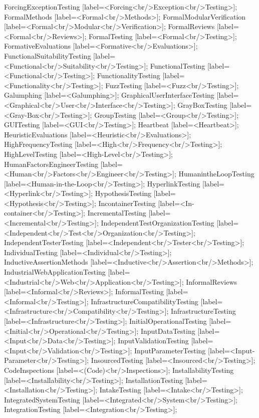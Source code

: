 \documentclass{article}
\begin{document}
{ForcingExceptionTesting [label=<Forcing<br/>Exception<br/>Testing>];
FormalMethods [label=<Formal<br/>Methods>];
FormalModularVerification [label=<Formal<br/>Modular<br/>Verification>];
FormalReviews [label=<Formal<br/>Reviews>];
FormalTesting [label=<Formal<br/>Testing>];
FormativeEvaluations [label=<Formative<br/>Evaluations>];
FunctionalSuitabilityTesting [label=<Functional<br/>Suitability<br/>Testing>];
FunctionalTesting [label=<Functional<br/>Testing>];
FunctionalityTesting [label=<Functionality<br/>Testing>];
FuzzTesting [label=<Fuzz<br/>Testing>];
Galumphing [label=<Galumphing>];
GraphicalUserInterfaceTesting [label=<Graphical<br/>User<br/>Interface<br/>Testing>];
GrayBoxTesting [label=<Gray-Box<br/>Testing>];
GroupTesting [label=<Group<br/>Testing>];
GUITesting [label=<GUI<br/>Testing>];
Heartbeat [label=<Heartbeat>];
HeuristicEvaluations [label=<Heuristic<br/>Evaluations>];
HighFrequencyTesting [label=<High<br/>Frequency<br/>Testing>];
HighLevelTesting [label=<High-Level<br/>Testing>];
HumanFactorsEngineerTesting [label=<Human<br/>Factors<br/>Engineer<br/>Testing>];
HumanintheLoopTesting [label=<Human-in-the-Loop<br/>Testing>];
HyperlinkTesting [label=<Hyperlink<br/>Testing>];
HypothesisTesting [label=<Hypothesis<br/>Testing>];
IncontainerTesting [label=<In-container<br/>Testing>];
IncrementalTesting [label=<Incremental<br/>Testing>];
IndependentTestOrganizationTesting [label=<Independent<br/>Test<br/>Organization<br/>Testing>];
IndependentTesterTesting [label=<Independent<br/>Tester<br/>Testing>];
IndividualTesting [label=<Individual<br/>Testing>];
InductiveAssertionMethods [label=<Inductive<br/>Assertion<br/>Methods>];
IndustrialWebApplicationTesting [label=<Industrial<br/>Web<br/>Application<br/>Testing>];
InformalReviews [label=<Informal<br/>Reviews>];
InformalTesting [label=<Informal<br/>Testing>];
InfrastructureCompatibilityTesting [label=<Infrastructure<br/>Compatibility<br/>Testing>];
InfrastructureTesting [label=<Infrastructure<br/>Testing>];
InitialOperationalTesting [label=<Initial<br/>Operational<br/>Testing>];
InputDataTesting [label=<Input<br/>Data<br/>Testing>];
InputValidationTesting [label=<Input<br/>Validation<br/>Testing>];
InputParameterTesting [label=<Input-Parameter<br/>Testing>];
InsourcedTesting [label=<Insourced<br/>Testing>];
CodeInspections [label=<(Code)<br/>Inspections>];
InstallabilityTesting [label=<Installability<br/>Testing>];
InstallationTesting [label=<Installation<br/>Testing>];
IntakeTesting [label=<Intake<br/>Testing>];
IntegratedSystemTesting [label=<Integrated<br/>System<br/>Testing>];
IntegrationTesting [label=<Integration<br/>Testing>];
}
\end{document}
